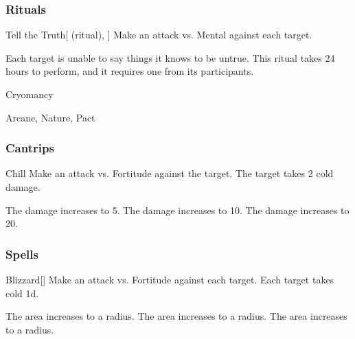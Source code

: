 \subsubsection{Rituals}


\lowercase{\hypertarget{spell:Tell the Truth}{}}\label{spell:Tell the Truth}
\begin{attuneability}[Rank 4]{\hypertarget{spell:Tell the Truth}{Tell the Truth}}[ (ritual), ]
Make an attack vs. Mental against each target.

\hit Each target is unable to say things it knows to be untrue.
This ritual takes 24 hours to perform, and it requires one  from its participants.
\end{attuneability}
\vspace{0.25em}


\newpage
\begin{spellsection}{Cryomancy}

\begin{spellheader}
\end{spellheader}


 Arcane, Nature, Pact

\subsubsection{Cantrips}


\begin{freeability}{Chill}
Make an attack vs. Fortitude against the target.
\hit The target takes 2 cold damage.

\rankline
{} The damage increases to 5.
 The damage increases to 10.
 The damage increases to 20.
\end{freeability}

\end{spellsection}


\subsubsection{Spells}


\lowercase{\hypertarget{spell:Blizzard}{}}\label{spell:Blizzard}
\begin{freeability}[Rank 1]{\hypertarget{spell:Blizzard}{Blizzard}}[]
Make an attack vs. Fortitude against each target.
\hit Each target takes cold  \minus1d.

\rankline
{} The area increases to a \areamed radius.
 The area increases to a \arealarge radius.
 The area increases to a \areahuge radius.

\end{freeability}
\vspace{0.25em}



